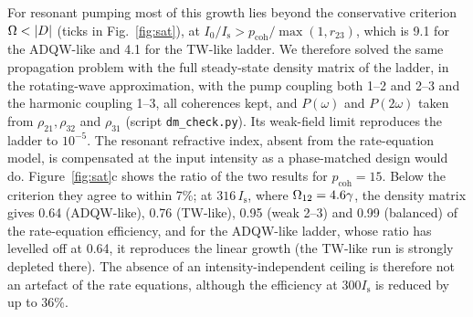 \documentclass[11pt]{article}
\newcommand{\Is}{I_\mathrm{s}}
\let\hbar\relax\DeclareRobustCommand{\hbar}{{\mathchar'26\mkern-9mu h}}
\begin{document}
For resonant pumping most of this growth lies beyond the conservative criterion $\hbar\Omega<|D|$ (ticks in Fig.~\ref{fig:sat}), at $I_0/\Is>p_\mathrm{coh}/\max(1,r_{23})$, which is 9.1 for the ADQW-like and 4.1 for the TW-like ladder. We therefore solved the same propagation problem with the full steady-state density matrix of the ladder, in the rotating-wave approximation, with the pump coupling both 1--2 and 2--3 and the harmonic coupling 1--3, all coherences kept, and $P(\omega)$ and $P(2\omega)$ taken from $\rho_{21},\rho_{32}$ and $\rho_{31}$ (script \texttt{dm\_check.py}). Its weak-field limit reproduces the ladder to $10^{-5}$. The resonant refractive index, absent from the rate-equation model, is compensated at the input intensity as a phase-matched design would do. Figure~\ref{fig:sat}c shows the ratio of the two results for $p_\mathrm{coh}=15$. Below the criterion they agree to within 7\%; at $316\,\Is$, where $\hbar\Omega_{12}=4.6\gamma$, the density matrix gives 0.64 (ADQW-like), 0.76 (TW-like), 0.95 (weak 2--3) and 0.99 (balanced) of the rate-equation efficiency, and for the ADQW-like ladder, whose ratio has levelled off at 0.64, it reproduces the linear growth (the TW-like run is strongly depleted there). The absence of an intensity-independent ceiling is therefore not an artefact of the rate equations, although the efficiency at $300\Is$ is reduced by up to 36\%.
\end{document}
